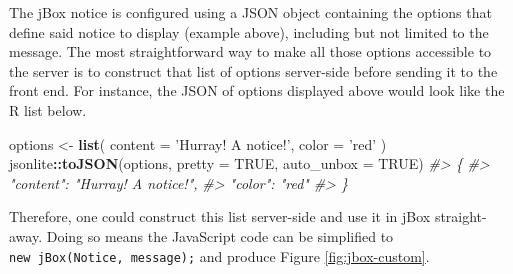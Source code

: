 \documentclass[10pt,]{krantz}
\makeatletter
\newenvironment{Shaded}{\begin{snugshade}}{\end{snugshade}}
\newcommand{\CommentTok}[1]{\textcolor[rgb]{0.37,0.37,0.37}{\textit{#1}}}
\newcommand{\DataTypeTok}[1]{\textcolor[rgb]{0.27,0.27,0.27}{#1}}
\newcommand{\KeywordTok}[1]{\textcolor[rgb]{0.27,0.27,0.27}{\textbf{#1}}}
\newcommand{\NormalTok}[1]{#1}
\newcommand{\OperatorTok}[1]{\textcolor[rgb]{0.43,0.43,0.43}{\textbf{#1}}}
\newcommand{\OtherTok}[1]{\textcolor[rgb]{0.37,0.37,0.37}{#1}}
\newcommand{\StringTok}[1]{\textcolor[rgb]{0.5,0.5,0.5}{#1}}
\newenvironment{kframe}{%
\medskip{}
\setlength{\fboxsep}{.8em}
 \def\at@end@of@kframe{}%
 \ifinner\ifhmode%
  \def\at@end@of@kframe{\end{minipage}}%
  \begin{minipage}{\columnwidth}%
 \fi\fi%
 \def\FrameCommand##1{\hskip\@totalleftmargin \hskip-\fboxsep
 \colorbox{shadecolor}{##1}\hskip-\fboxsep
     \hskip-\linewidth \hskip-\@totalleftmargin \hskip\columnwidth}%
 \MakeFramed {\advance\hsize-\width
   \@totalleftmargin\z@ \linewidth\hsize
   \@setminipage}}%
 {\par\unskip\endMakeFramed%
 \at@end@of@kframe}
\renewenvironment{Shaded}{\begin{kframe}}{\end{kframe}}
\makeatother
\begin{document}
The jBox notice is configured using a JSON object containing the options that define said notice to display (example above), including but not limited to the message. The most straightforward way to make all those options accessible to the server is to construct that list of options server-side before sending it to the front end. For instance, the JSON of options displayed above would look like the R list below.

\begin{Shaded}
\begin{Highlighting}[]
\NormalTok{options <-}\StringTok{ }\KeywordTok{list}\NormalTok{(}
  \DataTypeTok{content =} \StringTok{'Hurray! A notice!'}\NormalTok{,}
  \DataTypeTok{color =} \StringTok{'red'}
\NormalTok{)}
\NormalTok{jsonlite}\OperatorTok{::}\KeywordTok{toJSON}\NormalTok{(options, }\DataTypeTok{pretty =} \OtherTok{TRUE}\NormalTok{, }\DataTypeTok{auto_unbox =} \OtherTok{TRUE}\NormalTok{)}
\CommentTok{#> \{}
\CommentTok{#>   "content": "Hurray! A notice!",}
\CommentTok{#>   "color": "red"}
\CommentTok{#> \}}
\end{Highlighting}
\end{Shaded}

Therefore, one could construct this list server-side and use it in jBox straight-away. Doing so means the JavaScript code can be simplified to \texttt{new\ jBox(\textquotesingle{}Notice\textquotesingle{},\ message);} and produce Figure \ref{fig:jbox-custom}.
\end{document}
